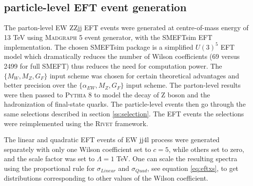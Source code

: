 \documentclass[a4paper,12pt]{article}
\begin{document}
		\subsection{particle-level EFT event generation}
			\par The parton-level EW ZZjj EFT events were generated at centre-of-mass energy of 13 TeV using \textsc{Madgraph 5}\cite{Alwall_2014} event generator,
			with the SMEFTsim\cite{Brivio_2017} EFT implementation. The chosen SMEFTsim package is a simplified $U(3)^5$ EFT model
			which dramatically reduces the number of Wilson coefficients (69\cite{Brivio_2017} versus 2499 for full SMEFT\cite{Alonso_2014}) 
			thus reduces the need for computation power. The $\{M_W, M_Z, G_F\}$ input scheme was chosen for certain theoretical 
			advantages and better precision over the $\{\alpha_{EW}, M_Z, G_F\}$ input scheme\cite{Brivio_2017}.
			The parton-level results were then passed to \textsc{Pythia 8}\cite{Sj_strand_2015}
			to model the decay of Z boson and the hadronization of final-state quarks. The particle-level events then go
			through the same selections described in section \ref{ss:selection}. The EFT events the selections were reimplemented using
			the \textsc{Rivet} framework\cite{Bierlich_2020}.
			\par The linear and quadratic EFT events of EW jj4l process were generated separately with only one Wilson 
			coefficient set to $c=5$, while others set to zero, and the scale factor was set to $\Lambda=1$ TeV. One 
			can scale the resulting spectra using the proportional rule for $\sigma_{Linear}$ and $\sigma_{Quad}$, see 
			equation \ref{eq:eftxs}, to get distributions corresponding to other values of the Wilson coefficient.
			
\end{document}
